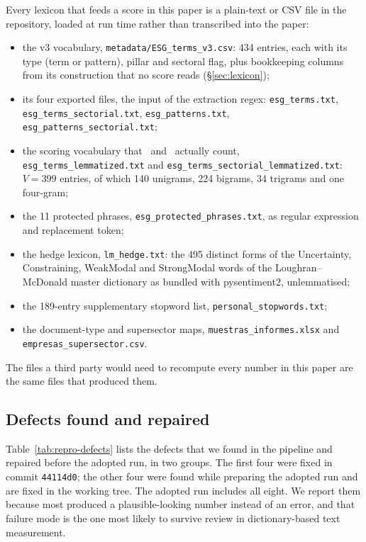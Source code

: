 Every lexicon that feeds a score in this paper is a plain-text or CSV file in
the repository, loaded at run time rather than transcribed into the paper:
\begin{itemize}
  \item the v3 vocabulary, \nolinkurl{metadata/ESG_terms_v3.csv}: 434 entries,
        each with its type (term or pattern), pillar and sectoral flag, plus
        bookkeeping columns from its construction that no score reads
        (\S\ref{sec:lexicon});
  \item its four exported files, the input of the extraction regex:
        \nolinkurl{esg_terms.txt}, \nolinkurl{esg_terms_sectorial.txt},
        \nolinkurl{esg_patterns.txt}, \nolinkurl{esg_patterns_sectorial.txt};
  \item the scoring vocabulary that \SUS\ and \BREADTH\ actually count,
        \nolinkurl{esg_terms_lemmatized.txt} and
        \nolinkurl{esg_terms_sectorial_lemmatized.txt}: $V = 399$ entries, of
        which 140 unigrams, 224 bigrams, 34 trigrams and one four-gram;
  \item the 11 protected phrases, \nolinkurl{esg_protected_phrases.txt}, as
        regular expression and replacement token;
  \item the hedge lexicon, \nolinkurl{lm_hedge.txt}: the 495 distinct forms
        of the Uncertainty, Constraining, WeakModal and StrongModal words of
        the Loughran--McDonald master dictionary \citep{loughran2011} as
        bundled with pysentiment2, unlemmatised;
  \item the 189-entry supplementary stopword list,
        \nolinkurl{personal_stopwords.txt};
  \item the document-type and supersector maps,
        \nolinkurl{muestras_informes.xlsx} and
        \nolinkurl{empresas_supersector.csv}.
\end{itemize}
The files a third party would need to recompute every number in this paper
are the same files that produced them.

\subsection{Defects found and repaired}

Table~\ref{tab:repro-defects} lists the defects that we found in the pipeline
and repaired before the adopted run, in two groups. The first four were fixed
in commit \texttt{44114d0}; the other four were found while preparing the adopted
run and are fixed in the working tree. The adopted run includes all eight.
We report them because most produced a plausible-looking number instead of an
error, and that failure mode is the one most likely to survive review in
dictionary-based text measurement.

